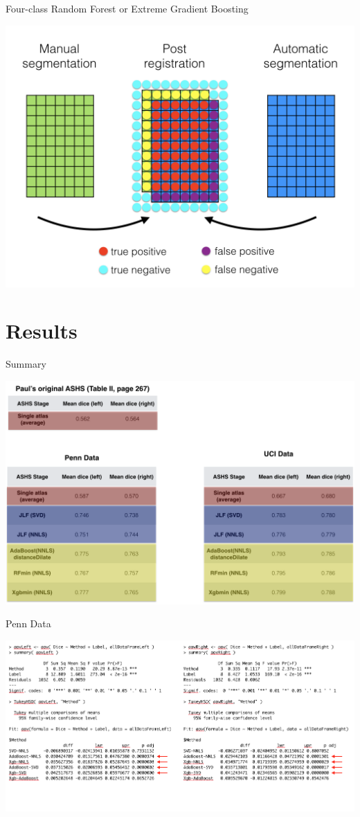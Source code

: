 \documentclass[ignorenonframetext,]{beamer}
\begin{document}
\begin{frame}{Four-class Random Forest or Extreme Gradient Boosting}

\centering
\includegraphics[width=0.85 \textwidth]{../Figures/correctiveLearning003.png}

\end{frame}

\section{Results}\label{results}

\begin{frame}{Summary}

\centering
\includegraphics[width=0.85 \textwidth]{../Figures/summaryResults.png}

\end{frame}

\begin{frame}{Penn Data}

\centering
\includegraphics[width=1 \textwidth]{../Figures/pennResults.png}

\end{frame}
\end{document}
